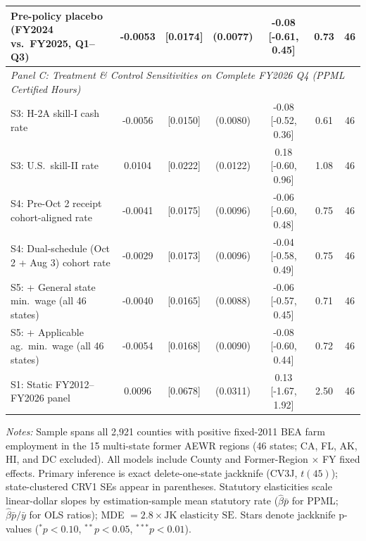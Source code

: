 \begin{table}[!htbp]
\begin{tabular}{lcccccc}
Pre-policy placebo (FY2024 vs.\ FY2025, Q1--Q3) & -0.0053 & [0.0174] & (0.0077) & -0.08 [-0.61, 0.45] & 0.73 & 46 \\
\midrule
\multicolumn{7}{l}{\textit{Panel C: Treatment \& Control Sensitivities on Complete FY2026 Q4 (PPML Certified Hours)}} \\
S3: H-2A skill-I cash rate & -0.0056 & [0.0150] & (0.0080) & -0.08 [-0.52, 0.36] & 0.61 & 46 \\
S3: U.S.\ skill-II rate & 0.0104 & [0.0222] & (0.0122) & 0.18 [-0.60, 0.96] & 1.08 & 46 \\
S4: Pre-Oct 2 receipt cohort-aligned rate & -0.0041 & [0.0175] & (0.0096) & -0.06 [-0.60, 0.48] & 0.75 & 46 \\
S4: Dual-schedule (Oct 2 + Aug 3) cohort rate & -0.0029 & [0.0173] & (0.0096) & -0.04 [-0.58, 0.49] & 0.75 & 46 \\
S5: + General state min.\ wage (all 46 states) & -0.0040 & [0.0165] & (0.0088) & -0.06 [-0.57, 0.45] & 0.71 & 46 \\
S5: + Applicable ag.\ min.\ wage (all 46 states) & -0.0054 & [0.0168] & (0.0090) & -0.08 [-0.60, 0.44] & 0.72 & 46 \\
S1: Static FY2012--FY2026 panel & 0.0096 & [0.0678] & (0.0311) & 0.13 [-1.67, 1.92] & 2.50 & 46 \\
\bottomrule
\end{tabular}
\begin{minipage}{0.96\linewidth}
\vspace{0.4em}\footnotesize
\textit{Notes:} Sample spans all 2,921 counties with positive fixed-2011 BEA farm employment in the 15 multi-state former AEWR regions (46 states; CA, FL, AK, HI, and DC excluded). All models include County and Former-Region $\times$ FY fixed effects. Primary inference is exact delete-one-state jackknife (CV3J, $t(45)$); state-clustered CRV1 SEs appear in parentheses. Statutory elasticities scale linear-dollar slopes by estimation-sample mean statutory rate ($\hat{\beta}\bar{p}$ for PPML; $\hat{\beta}\bar{p}/\bar{y}$ for OLS ratios); MDE $= 2.8 \times \text{JK elasticity SE}$. Stars denote jackknife p-values ($^{*}p<0.10$, $^{**}p<0.05$, $^{***}p<0.01$).
\end{minipage}
\end{table}
